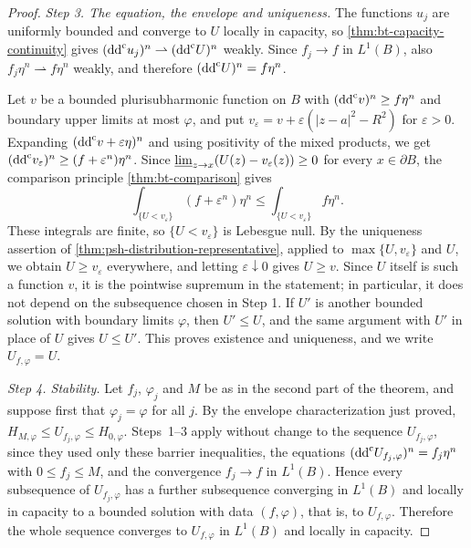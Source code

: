 \begin{proof}
\emph{Step 3. The equation, the envelope and uniqueness.}
The functions $u_j$ are uniformly bounded and converge to $U$ locally in capacity, so \cref{thm:bt-capacity-continuity} gives $(\mathrm{dd}^{\mathrm{c}} u_j)^n\rightharpoonup(\mathrm{dd}^{\mathrm{c}} U)^n$ weakly. Since $f_j\to f$ in $L^1(B)$, also $f_j\eta^n\rightharpoonup f\eta^n$ weakly, and therefore $(\mathrm{dd}^{\mathrm{c}} U)^n=f\eta^n$.

Let $v$ be a bounded plurisubharmonic function on $B$ with $(\mathrm{dd}^{\mathrm{c}} v)^n\ge f\eta^n$ and boundary upper limits at most $\varphi$, and put $v_\varepsilon=v+\varepsilon(|z-a|^2-R^2)$ for $\varepsilon>0$. Expanding $(\mathrm{dd}^{\mathrm{c}} v+\varepsilon\eta)^n$ and using positivity of the mixed products, we get $(\mathrm{dd}^{\mathrm{c}} v_\varepsilon)^n\ge(f+\varepsilon^n)\eta^n$. Since $\varliminf_{z\to x}(U(z)-v_\varepsilon(z))\ge0$ for every $x\in\partial B$, the comparison principle \cref{thm:bt-comparison} gives
\[
 \int_{\{U<v_\varepsilon\}}(f+\varepsilon^n)\eta^n\le\int_{\{U<v_\varepsilon\}}f\eta^n.
\]
These integrals are finite, so $\{U<v_\varepsilon\}$ is Lebesgue null. By the uniqueness assertion of \cref{thm:psh-distribution-representative}, applied to $\max\{U,v_\varepsilon\}$ and $U$, we obtain $U\ge v_\varepsilon$ everywhere, and letting $\varepsilon\downarrow0$ gives $U\ge v$. Since $U$ itself is such a function $v$, it is the pointwise supremum in the statement; in particular, it does not depend on the subsequence chosen in Step 1. If $U'$ is another bounded solution with boundary limits $\varphi$, then $U'\le U$, and the same argument with $U'$ in place of $U$ gives $U\le U'$. This proves existence and uniqueness, and we write $U_{f,\varphi}=U$.

\emph{Step 4. Stability.}
Let $f_j$, $\varphi_j$ and $M$ be as in the second part of the theorem, and suppose first that $\varphi_j=\varphi$ for all $j$. By the envelope characterization just proved, $H_{M,\varphi}\le U_{f_j,\varphi}\le H_{0,\varphi}$. Steps~1--3 apply without change to the sequence $U_{f_j,\varphi}$, since they used only these barrier inequalities, the equations $(\mathrm{dd}^{\mathrm{c}} U_{f_j,\varphi})^n=f_j\eta^n$ with $0\le f_j\le M$, and the convergence $f_j\to f$ in $L^1(B)$. Hence every subsequence of $U_{f_j,\varphi}$ has a further subsequence converging in $L^1(B)$ and locally in capacity to a bounded solution with data $(f,\varphi)$, that is, to $U_{f,\varphi}$. Therefore the whole sequence converges to $U_{f,\varphi}$ in $L^1(B)$ and locally in capacity.


\end{proof}
